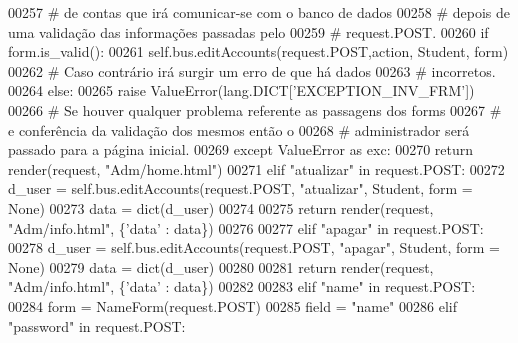 \begin{DoxyCode}
00257                     \textcolor{comment}{#   de contas que irá comunicar-se com o banco de dados }
00258                     \textcolor{comment}{#   depois de uma validação das informações passadas pelo}
00259                     \textcolor{comment}{#   request.POST.}
00260                     \textcolor{keywordflow}{if} form.is\_valid():
00261                         self.bus.editAccounts(request.POST,action, Student, form)
00262                     \textcolor{comment}{# Caso contrário irá surgir um erro de que há dados}
00263                     \textcolor{comment}{#   incorretos.}
00264                     \textcolor{keywordflow}{else}:
00265                         \textcolor{keywordflow}{raise} ValueError(lang.DICT[\textcolor{stringliteral}{'EXCEPTION\_INV\_FRM'}])
00266                 \textcolor{comment}{# Se houver qualquer problema referente as passagens dos forms }
00267                 \textcolor{comment}{#   e conferência da validação dos mesmos então o }
00268                 \textcolor{comment}{#   administrador será passado para a página inicial.}
00269                 \textcolor{keywordflow}{except} ValueError \textcolor{keyword}{as} exc:
00270                     \textcolor{keywordflow}{return} render(request, \textcolor{stringliteral}{"Adm/home.html"})
00271             \textcolor{keywordflow}{elif} \textcolor{stringliteral}{"atualizar"} \textcolor{keywordflow}{in} request.POST:
00272                 d\_user = self.bus.editAccounts(request.POST, \textcolor{stringliteral}{"atualizar"}, Student, form = \textcolor{keywordtype}{None})
00273                 data = dict(d\_user)
00274 
00275                 \textcolor{keywordflow}{return} render(request, \textcolor{stringliteral}{"Adm/info.html"}, \{\textcolor{stringliteral}{'data'} : data\})
00276             
00277             \textcolor{keywordflow}{elif} \textcolor{stringliteral}{"apagar"} \textcolor{keywordflow}{in} request.POST:
00278                 d\_user = self.bus.editAccounts(request.POST, \textcolor{stringliteral}{"apagar"}, Student, form = \textcolor{keywordtype}{None})
00279                 data = dict(d\_user)
00280 
00281                 \textcolor{keywordflow}{return} render(request, \textcolor{stringliteral}{"Adm/info.html"}, \{\textcolor{stringliteral}{'data'} : data\})
00282 
00283             \textcolor{keywordflow}{elif} \textcolor{stringliteral}{"name"} \textcolor{keywordflow}{in} request.POST:
00284                 form = NameForm(request.POST)
00285                 field = \textcolor{stringliteral}{"name"}
00286             \textcolor{keywordflow}{elif}  \textcolor{stringliteral}{"password"} \textcolor{keywordflow}{in} request.POST:

\end{DoxyCode}
